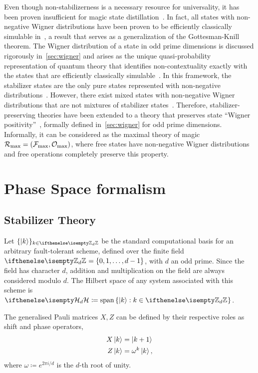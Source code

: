 \documentclass[pra,
aps,
twocolumn,
superscriptaddress,
groupedaddress,
nofootinbib,
reprint
]{revtex4-1}
\begin{document}
Even though non-stabilizerness is a necessary resource for universality, it has been proven insufficient for magic state distillation~\cite{cit:bravyi, cit:campbell}.
In fact, all states with non-negative Wigner distributions have been proven to be efficiently classically simulable in~\cite{cit:mari}, a result that serves as a generalization of the Gottesman-Knill theorem.
The Wigner distribution of a state in odd prime dimensions is discussed rigorously in~\cref{sec:wigner} and arises as the unique quasi-probability representation of quantum theory that identifies non-contextuality exactly with the states that are efficiently classically simulable~\cite{cit:howard2, cit:veitch2}.
In this framework, the stabilizer states are the only pure states represented with non-negative distributions~\cite{cit:gross3}. 
However, there exist mixed states with non-negative Wigner distributions that are not mixtures of stabilizer states~\cite{cit:gross}.
Therefore, stabilizer-preserving theories have been extended to a theory that preserves state ``Wigner positivity''~\cite{cit:wang}, formally defined in~\cref{sec:wigner} for odd prime dimensions.
Informally, it can be considered as the maximal theory of magic $\mathcal{R}_{\rm{}max} = (\mathcal{F}_{\rm{max}}, \mathcal{O}_{\rm{}max})$, where free states have non-negative Wigner distributions and free operations completely preserve this property.


\section{Phase Space formalism}
\label{sec:ps}

\subsection{Stabilizer Theory}\label{sec:so}

Let $\{\ket{k}\}_{k \in \zd}$ be the standard computational basis for an arbitrary fault-tolerant scheme, defined over the finite field $\zd = \{ 0, 1, \dots,d-1 \}$, with $d$ an odd prime. 
Since the field has character $d$, addition and multiplication on the field are always considered modulo $d$.
The Hilbert space of any system associated with this scheme is $\hd \coloneqq \spanv{\ket{k}: k \in \zd}$.

The generalised Pauli matrices $X, Z$ can be defined by their respective roles as shift and phase operators,
\begin{align}
    X \ket{k} &= \ket{k + 1} \label{eq:xpauli}\\
	Z \ket{k} &= \omega^k \ket{k}, \label{eq:zpauli}
\end{align}
where $\omega \coloneqq e^{2\pi i/d}$ is the $d$-th root of unity. 
\end{document}

